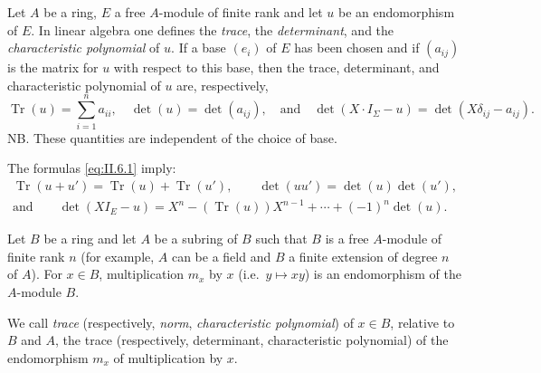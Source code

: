 


Let $A$ be a ring, $E$ a free $A$-module of finite rank and let $u$ be an
endomorphism of $E$. In linear algebra one defines the \emph{trace}, the
\emph{determinant}, and the \emph{characteristic polynomial} of $u$. If a
base $(e_{i})$ of $E$ has been chosen and if $(a_{ij})$ is the matrix for
$u$ with respect to this base, then the trace, determinant, and
characteristic polynomial of $u$ are, respectively,
\begin{equation}
\operatorname{Tr}(u)=\sum_{i=1}^{n}a_{ii},\quad
\det(u)=\det(a_{ij}),\quad\text{and}\quad
\det(X\cdot I_{\Sigma}-u)=\det(X\delta_{ij}-a_{ij}).
\label{eq:II.6.1}
\end{equation}
NB. These quantities are independent of the choice of base.

The formulas \eqref{eq:II.6.1} imply:
\begin{equation}
\begin{gathered}
\operatorname{Tr}(u+u')=\operatorname{Tr}(u)+\operatorname{Tr}(u'),\qquad
\det(uu')=\det(u)\det(u'),\\
\text{and}\qquad
\det(XI_{E}-u)=X^{n}-(\operatorname{Tr}(u))X^{n-1}+\cdots+(-1)^{n}\det(u).
\end{gathered}
\label{eq:II.6.2}
\end{equation}


Let $B$ be a ring and let $A$ be a subring of $B$ such that $B$ is a free
$A$-module of finite rank $n$ (for example, $A$ can be a field and $B$ a
finite extension of degree $n$ of $A$). For $x\in B$, multiplication $m_{x}$
by $x$ (i.e.\ $y\mapsto xy$) is an endomorphism of the $A$-module $B$.

\begin{definition}\label{def:II.6.1}
We call \emph{trace} (respectively, \emph{norm}, \emph{characteristic
polynomial}) of $x\in B$, relative to $B$ and $A$, the trace (respectively,
determinant, characteristic polynomial) of the endomorphism $m_{x}$ of
multiplication by $x$.
\end{definition}

